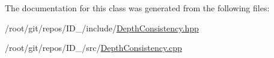 \-The documentation for this class was generated from the following files\-:\begin{DoxyCompactItemize}
\item 
/root/git/repos/\-I\-D\-\_/include/\hyperlink{DepthConsistency_8hpp}{\-Depth\-Consistency.\-hpp}\item 
/root/git/repos/\-I\-D\-\_/src/\hyperlink{DepthConsistency_8cpp}{\-Depth\-Consistency.\-cpp}\end{DoxyCompactItemize}
